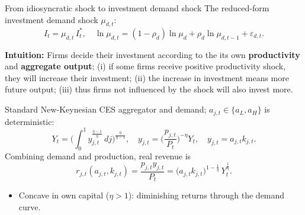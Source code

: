 \documentclass[9pt]{beamer}
\begin{document}
\begin{frame}{From idiosyncratic shock to investment demand shock}
	The reduced-form investment demand shock $\mu_{d,t}$:
		\[
			I_t=\mu_{d,t}\,I_t^{*},\quad
			\ln\mu_{d,t}=(1-\rho_d)\ln\mu_d+\rho_d\ln\mu_{d,t-1}+\varepsilon_{d,t}.
		\]

	\vspace{0.5em}

	\textbf{Intuition:} Firms decide their investment according to the its own \textbf{productivity} and \textbf{aggregate output}; (i) if some firms receive positive productivity shock, they will increase their investment; (ii) the increase in investment means more future output; (iii) thus firms not influenced by the shock will also invest more.
	\vspace{1em}

	Standard New-Keynesian CES aggregator and demand; $a_{j,t}\in\{a_L,a_H\}$ is deterministic:
	\[
		Y_t=\Big(\int_0^1 y_{j,t}^{\frac{\eta-1}{\eta}}\,dj\Big)^{\frac{\eta}{\eta-1}},
		\quad
		y_{j,t}=\Big(\frac{p_{j,t}}{P_t}\Big)^{-\eta}Y_t,
		\quad
		y_{j,t}=a_{j,t}k_{j,t}.
	\]
	Combining demand and production, real revenue is
	\[
		r_{j,t}(a_{j,t},k_{j,t})=\frac{p_{j,t}y_{j,t}}{P_t}
		=\big(a_{j,t}k_{j,t}\big)^{1-\frac1\eta}\,Y_t^{\frac1\eta}.
	\]
	\begin{itemize}\small
		\item Concave in own capital ($\eta>1$): diminishing returns through the demand curve.
	\end{itemize}
\end{frame}
\end{document}
